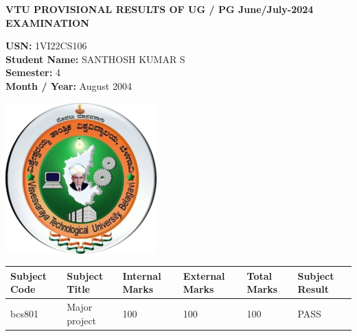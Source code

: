 \documentclass[a4paper,12pt]{article}
\begin{document}
\begin{center}
    \textbf{VTU PROVISIONAL RESULTS OF UG / PG June/July-2024 EXAMINATION}
\end{center}

\vspace{0.5cm}
\noindent
\begin{minipage}{0.7\textwidth}
\textbf{USN:} 1VI22CS106 \\
\textbf{Student Name:} SANTHOSH KUMAR S\\
\textbf{Semester: } 4\\
\textbf{Month / Year: } August 2004
\end{minipage}
\begin{minipage}{0.2\textwidth}
    \includegraphics[width=\textwidth]{vtulogo.png}
\end{minipage}
\vspace{0.5cm}

\begin{center}
\begin{tabular}{|m{2cm}|m{7cm}|m{2cm}|m{2cm}|m{2cm}|m{2cm}|}
    \hline
    \textbf{Subject Code} & \textbf{Subject Title} & \textbf{Internal Marks} & \textbf{External Marks} & \textbf{Total Marks} & \textbf{Subject Result} \\
    \hline
    bcs801 & Major project & 100 & 100 & 100 & PASS \\ \hline
    \end{tabular}
\end{center}
\end{document}
